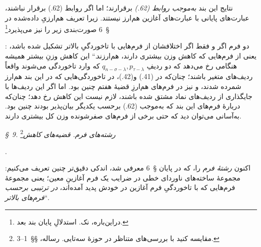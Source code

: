 \documentclass[11pt]{article}
\providecommand{\glqq}{\textquotedblbase}
\providecommand{\grqq}{\textquotedblleft}
\newcommand{\srcLTR}[1]{\relax\ifmmode\text{\mbox{\babelsublr{\foreignlanguage{english}{#1}}}}\else\babelsublr{\foreignlanguage{english}{#1}}\fi}
\newcommand{\srcfn}[2]{\begingroup\renewcommand{\thefootnote}{\srcLTR{#1}}\footnote{#2}\addtocounter{footnote}{-1}\endgroup}
\begin{document}
نتایج این بند \emph{به‌موجب روابط (62.)} برقرارند؛ اما اگر روابط (62.) برقرار نباشند، عبارت‌های پایانی با عبارت‌های آغازین هم‌ارز نیستند. زیرا تعریف هم‌ارزیِ داده‌شده در \S\ 6 صورت‌بندی زیر را نیز می‌پذیرد\srcfn{**)}{دراین‌باره، نک. استدلالِ پایان بند بعد.}: \glqq{}دو فرم اگر و فقط اگر اختلافشان از فرم‌هایی با تاخوردگیِ بالاتر تشکیل شده باشد، یعنی از فرم‌هایی که کاهش وزن بیشتری دارند، هم‌ارزند.\grqq{} این کاهش وزنِ بیشتر همیشه هنگامی رخ می‌دهد که دو ردیفِ $q_{n-\sigma-\lambda},p_{\tau-\lambda}$ که وارد تاخوردگی می‌شوند واقعاً ردیف‌های متغیر باشند؛ چنان‌که در (41.) و(42.)، در تاخوردگی‌هایی که در این بند هم‌ارز شمرده شدند، و نیز در فرم‌های هم‌ارزِ قضیهٔ هفتم چنین بود. اما اگر این ردیف‌ها با جایگذاری از ردیف‌های نماد مشتق شده باشند، لازم نیست این کاهش رخ دهد؛ چنان‌که دربارهٔ فرم‌های این بند که به‌موجب (62.) برحسب یکدیگر بیان‌پذیر بودند چنین بود. به‌آسانی می‌توان دید که حتی برخی از فرم‌های صفرشونده وزن کل بیشتری دارند.

\begin{center}
\emph{\S\ 9. رشته‌های فرم. قضیه‌های کاهش}\srcfn{*)}{مقایسه کنید با بررسی‌های متناظر در حوزهٔ سه‌تایی. رساله، \S\S\ 1--3.}.
\end{center}
اکنون \emph{رشتهٔ فرم} را، که در پایان \S\ 6 معرفی شد، اندکی دقیق‌تر چنین تعریف می‌کنیم: \glqq{}مجموعهٔ ساخته‌های ناوردای خطی در ضرایب یک فرم آغازینِ معین؛ یعنی مجموعهٔ فرم‌هایی که با تاخوردگیِ فرم آغازین در خودش پدید آمده‌اند، \emph{در ترتیبی برحسب فرم‌های بالاتر}\grqq{}.
\end{document}
